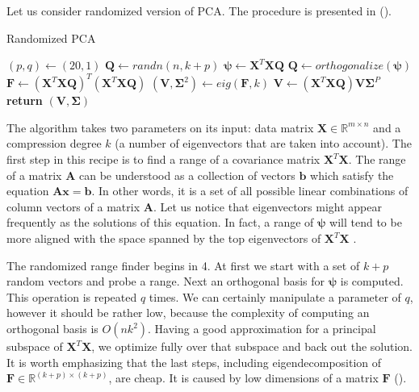 Let us consider randomized version of PCA. The procedure is presented in  (\cite{Mineiro}). 
\begin{algorithm}
    \caption{Randomized PCA}\label{alg:rpca1}
    \begin{algorithmic}[1]
        \State $(p,q) \gets (20,1)$
        \State $\boldsymbol{Q} \gets randn(n, k+p)$
                \State $\boldsymbol{\psi} \gets \boldsymbol{X}^T\boldsymbol{X}\boldsymbol{Q}$
                \State $\boldsymbol{Q} \gets orthogonalize(\boldsymbol{\psi})$
            \EndFor
            \State $\boldsymbol{F} \gets (\boldsymbol{X}^T\boldsymbol{X}\boldsymbol{Q})^T(\boldsymbol{X}^T\boldsymbol{X}\boldsymbol{Q})$
            \State $(\boldsymbol{V},\boldsymbol{\Sigma}^2) \gets eig(\boldsymbol{F},k)$
            \State $\boldsymbol{V} \gets (\boldsymbol{X}^T\boldsymbol{X}\boldsymbol{Q})\boldsymbol{V}\boldsymbol{\Sigma}^P$
            \State \textbf{return} $(\boldsymbol{V}, \boldsymbol{\Sigma})$
        \EndFunction
    \end{algorithmic}
\end{algorithm}
The algorithm takes two parameters on its input: data matrix $\boldsymbol{X} \in \mathbb{R}^{m \times n}$ and a compression degree $k$ (a number of eigenvectors that are taken into account). The first step in this recipe is to find a range of a covariance matrix $\boldsymbol{X}^T\boldsymbol{X}$. The range of a matrix $\boldsymbol{A}$ can be understood as a collection of vectors $\boldsymbol{b}$ which satisfy the equation $\boldsymbol{A}\boldsymbol{x}=\boldsymbol{b}$. In other words, it is a set of all possible linear combinations of column vectors of a matrix $\boldsymbol{A}$. Let us notice that eigenvectors might appear frequently as the solutions of this equation. In fact, a range of $\boldsymbol{\psi}$ will tend to be more aligned with the space spanned by the top eigenvectors of $\boldsymbol{X}^T\boldsymbol{X}$ \cite{Mineiro}. 

The randomized range finder begins in 4. At first we start with a set of $k+p$ random vectors and probe a range. Next an orthogonal basis for $\boldsymbol{\psi}$ is computed. This operation is repeated $q$ times. We can certainly manipulate a parameter of $q$, however it should be rather low, because the complexity of computing an orthogonal basis is $O(nk^2)$. 
Having a good approximation for a principal subspace of $\boldsymbol{X}^T\boldsymbol{X}$, we optimize fully over that subspace and back out the solution. It is worth emphasizing that the last steps, including eigendecomposition of $\boldsymbol{F} \in \mathbb{R}^{(k+p) \times (k+p)}$, are cheap. It is caused by low dimensions of a matrix $\boldsymbol{F}$ (\cite{Mineiro}).

